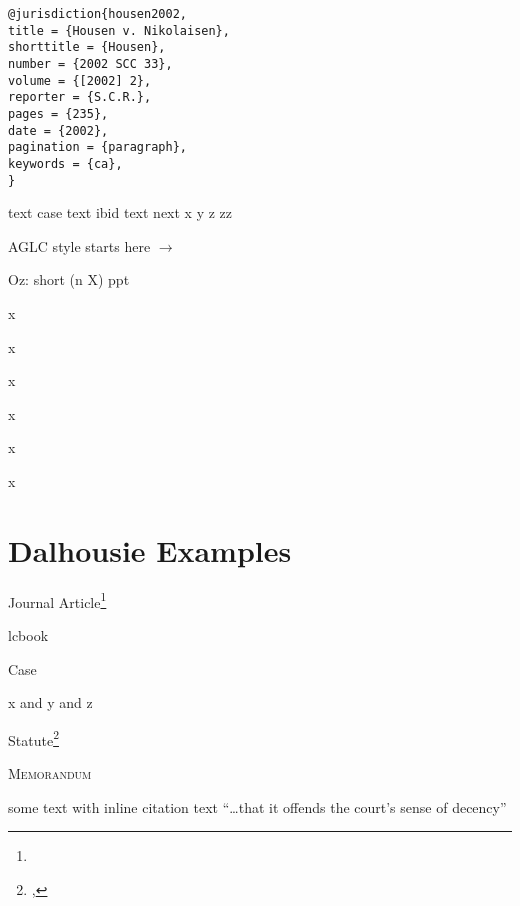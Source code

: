 \begin{verbatim}
@jurisdiction{housen2002,
title = {Housen v. Nikolaisen},
shorttitle = {Housen},
number = {2002 SCC 33},
volume = {[2002] 2},
reporter = {S.C.R.},
pages = {235},
date = {2002},
pagination = {paragraph},
keywords = {ca},
}

\end{verbatim}


text case text ibid text next
x
y
z
zz

{
AGLC style starts here $\rightarrow$
\lcsetstyleaglc

Oz: short (n X) ppt

x

x

x

x

x

x

}



\section{Dalhousie Examples}

Journal Article\footnote{}

lcbook

Case

x and y
 and z
 
Statute\footnote{, } 

\textsc{Memorandum} 

\medskip
some text with inline citation  text ``\ldots that it offends the court's sense of decency'' 

